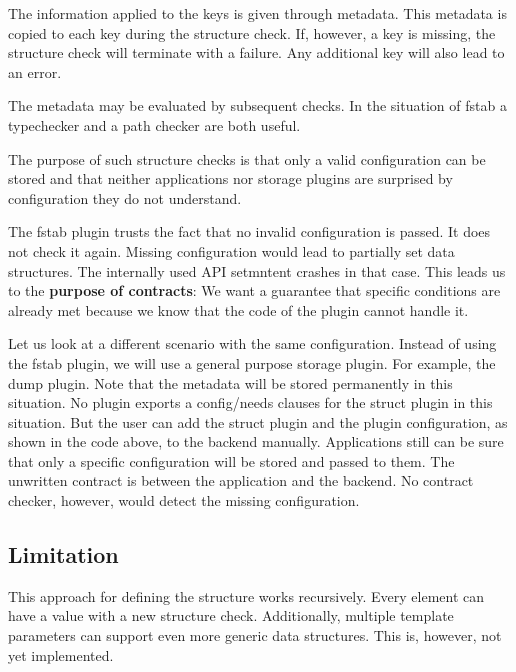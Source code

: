 The information applied to the keys is given through metadata. This metadata is copied to each key during the structure check. If, however, a key is missing, the structure check will terminate with a failure. Any additional key will also lead to an error.

The metadata may be evaluated by subsequent checks. In the situation of fstab a typechecker and a path checker are both useful.

The purpose of such structure checks is that only a valid configuration can be stored and that neither applications nor storage plugins are surprised by configuration they do not understand.

The fstab plugin trusts the fact that no invalid configuration is passed. It does not check it again. Missing configuration would lead to partially set data structures. The internally used A\+PI {\ttfamily setmntent} crashes in that case. This leads us to the {\bfseries purpose of contracts}\+: We want a guarantee that specific conditions are already met because we know that the code of the plugin cannot handle it.

Let us look at a different scenario with the same configuration. Instead of using the fstab plugin, we will use a general purpose storage plugin. For example, the dump plugin. Note that the metadata will be stored permanently in this situation. No plugin exports a {\ttfamily config/needs} clauses for the struct plugin in this situation. But the user can add the struct plugin and the plugin configuration, as shown in the code above, to the backend manually. Applications still can be sure that only a specific configuration will be stored and passed to them. The unwritten contract is between the application and the backend. No contract checker, however, would detect the missing configuration.

\subsection*{Limitation}

This approach for defining the structure works recursively. Every element can have a value with a new structure check. Additionally, multiple template parameters can support even more generic data structures. This is, however, not yet implemented. 
